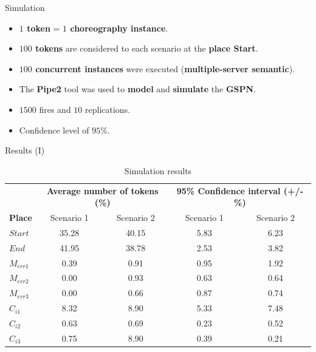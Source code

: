 \documentclass[xcolor=svgnames]{beamer}
\newcommand {\otoprule}{\midrule [\heavyrulewidth]}  %
\begin{document}
  
  \begin{frame}{ Simulation}
   \begin{itemize}
     \item <1-> \textbf{$1$ token} = \textbf{$1$ choreography instance}.
     \item <2-> \textbf{$100$ tokens} are considered to each scenario at the \textbf{place Start}.
     \item <2-> \textbf{$100$ concurrent instances} were executed (\textbf{multiple-server semantic}).
     \item <3-> The \textbf{Pipe2} tool was used to \textbf{model} and \textbf{simulate} the \textbf{GSPN}.
     \item <4-> $1500$ fires and $10$ replications.
     \item <4-> Confidence level of $95\%$.
   \end{itemize}
  \end{frame}


  \begin{frame}{ Results (I)}

{ \footnotesize
     \begin{table} [tp] %
            \centering
            \caption{Simulation results } %
            \label{table:simulationsAll}
            \begin{tabular}{l c c c c}
		  \toprule
        	 	        & \multicolumn{2}{c|}{ \textbf{Average number of tokens (\%)} } & \multicolumn{2}{c|}{ \textbf{95\% Confidence interval  (+/- \%)} }  \\
        	  \textbf{Place}      &  Scenario 1   &   Scenario 2  	 &  Scenario 1 	  &   Scenario 2 \\ 
		  \otoprule
        	  $Start$ &    35.28	 &    40.15        &   5.83    	 &    6.23         \\
        	  $End$   &    41.95	 &    38.78        &   2.53  	  &  3.82	\\
        	
		\midrule
        	
        	  $M_{err1}$	& 0.39	 & 0.91 		& 0.95	&  1.92	\\
        	  $M_{err2}$	& 0.00	 & 0.93 		& 0.63		&  0.64	\\
        	  $M_{err3}$	& 0.00   & 0.66 		& 0.87	&  0.74	\\
		\midrule
		\midrule
        	  $C_{i1}$ 	& 8.32	 & 8.90 	& 5.33	&  7.48	\\
              $C_{i2}$ 	& 0.63	 & 0.69 	& 0.23	&  0.52	\\
              $C_{i3}$ 	& 0.75	 & 8.90 	& 0.39	&  0.21	\\

		\bottomrule
	  \end{tabular}
        \end{table}
}
  \end{frame}
\end{document}
